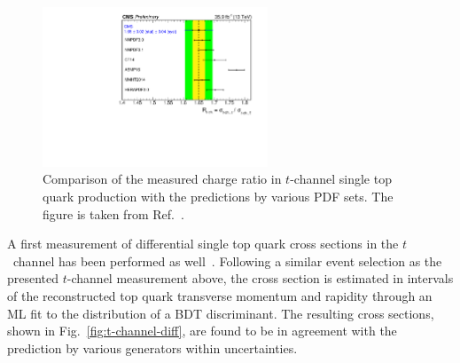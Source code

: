 \documentclass{PoS}
\begin{document}

\begin{figure}[!htb]
\begin{center}
\includegraphics[width=0.6\textwidth]{tch3.pdf}
\caption{\label{fig:t-channel-ratio}Comparison of the measured charge ratio in $t$-channel single top quark production with the predictions by various PDF sets. The figure is taken from Ref.~\cite{tch}.}
\end{center}
\end{figure}

A first measurement of differential single top quark cross sections in the $t$~channel has been performed as well~\cite{tchdiff}. Following a similar event selection as the presented $t$-channel measurement above, the cross section is estimated in intervals of the reconstructed top quark transverse momentum and rapidity through an ML fit to the distribution of a BDT discriminant. The resulting cross sections, shown in Fig.~\ref{fig:t-channel-diff}, are found to be in agreement with the prediction by various generators within uncertainties.
\end{document}
